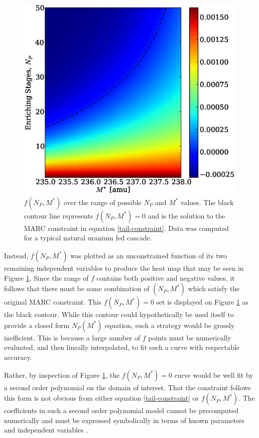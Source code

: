 \documentclass{ansconf}
\begin{document}
\begin{figure}[htpb]
\begin{center}
\includegraphics[scale=0.5]{np_constraint.eps}
\caption{$f(N_P, M^*)$ over the range of possible $N_P$ and $M^*$ values.  The black
contour line represents $f(N_P, M^*)=0$ and is the solution to the MARC constraint
in equation \ref{tail-constraint}. 
Data was computed for a typical natural uranium fed cascade.}
\label{np_constraint_fig}
\end{center}
\end{figure}

Instead, $f(N_P,M^*)$ was plotted as an unconstrained function of its two remaining 
independent variables to produce the heat map that may be seen in Figure 
\ref{np_constraint_fig}.  Since the range of $f$ contains both positive and negative
values, it follows that there must be some combination of $(N_P,M^*)$ which
satisfy the original MARC constraint.  This $f(N_P, M^*)=0$ set is displayed on Figure 
\ref{np_constraint_fig} as the black contour.  While this contour could hypothetically
be used itself to provide a closed form $N_P(M^*)$ equation, such a strategy would 
be grossly inefficient.  This is because a large number of $f$ points must be 
numerically evaluated, and then lineally interpolated, to fit such a curve with
respectable accuracy.

Rather, by inspection of Figure \ref{np_constraint_fig}, the $f(N_P, M^*)=0$ curve 
would be well fit by a second order polynomial on the domain of interest.
That the constraint follows this form is not obvious from either equation 
\ref{tail-constraint} or $f(N_P,M^*)$.  The coefficients in 
such a second order polynomial model cannot be precomputed  numerically and must be 
expressed symbolically in terms of known parameters and independent variables 
\cite{Sacks:1989:ASS:1623755.1623823}.
\end{document}
